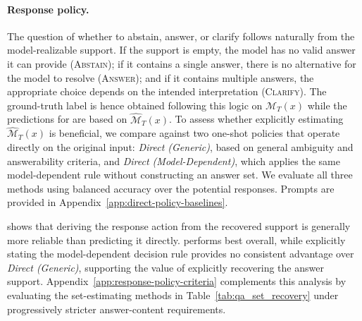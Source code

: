 \paragraph{Response policy.}
The question of whether to abstain, answer, or clarify follows naturally from the model-realizable support. If the support is empty, the model has no valid answer it can provide (\textsc{Abstain}); if it contains a single answer, there is no alternative for the model to resolve (\textsc{Answer}); and if it contains multiple answers, the appropriate choice depends on the intended interpretation (\textsc{Clarify}). The ground-truth label is hence obtained following this logic on  $\mathcal{M}_T(x)$ while the predictions for \circleclar{} are based on $\widehat{\mathcal{M}}_T(x)$.
To assess whether explicitly estimating $\widehat{\mathcal{M}}_T(x)$ is beneficial, we compare against two one-shot policies that operate directly on the original input:  \emph{Direct (Generic)}, based on general ambiguity and answerability criteria, and \emph{Direct (Model-Dependent)}, which applies the same model-dependent rule without constructing an answer set. We evaluate all three methods using balanced accuracy over the potential responses. Prompts are provided in Appendix~\ref{app:direct-policy-baselines}.

  shows that deriving the response action from the recovered support is generally more reliable than predicting it directly. \circleclar{} performs best overall, while explicitly stating the model-dependent decision rule provides no consistent advantage over \emph{Direct (Generic)}, supporting the value of explicitly recovering the answer support. Appendix~\ref{app:response-policy-criteria} complements this analysis by evaluating the set-estimating methods in Table~\ref{tab:qa_set_recovery} under progressively stricter answer-content requirements.


